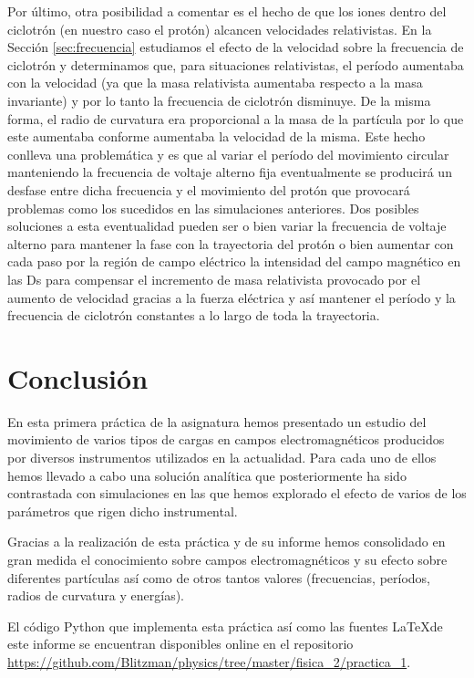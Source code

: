 \documentclass[journal]{IEEEtran}
\begin{document}
Por último, otra posibilidad a comentar es el hecho de que los iones dentro del ciclotrón (en nuestro caso el protón) alcancen velocidades relativistas. En la Sección \ref{sec:frecuencia} estudiamos el efecto de la velocidad sobre la frecuencia de ciclotrón y determinamos que, para situaciones relativistas, el período aumentaba con la velocidad (ya que la masa relativista aumentaba respecto a la masa invariante) y por lo tanto la frecuencia de ciclotrón disminuye. De la misma forma, el radio de curvatura era proporcional a la masa de la partícula por lo que este aumentaba conforme aumentaba la velocidad de la misma. Este hecho conlleva una problemática y es que al variar el período del movimiento circular manteniendo la frecuencia de voltaje alterno fija eventualmente se producirá un desfase entre dicha frecuencia y el movimiento del protón que provocará problemas como los sucedidos en las simulaciones anteriores. Dos posibles soluciones a esta eventualidad pueden ser o bien variar la frecuencia de voltaje alterno para mantener la fase con la trayectoria del protón o bien aumentar con cada paso por la región de campo eléctrico la intensidad del campo magnético en las Ds para compensar el incremento de masa relativista provocado por el aumento de velocidad gracias a la fuerza eléctrica y así mantener el período y la frecuencia de ciclotrón constantes a lo largo de toda la trayectoria.

\section{Conclusión}
\label{sec:conclusion}
En esta primera práctica de la asignatura hemos presentado un estudio del movimiento de varios tipos de cargas en campos electromagnéticos producidos por diversos instrumentos utilizados en la actualidad. Para cada uno de ellos hemos llevado a cabo una solución analítica que posteriormente ha sido contrastada con simulaciones en las que hemos explorado el efecto de varios de los parámetros que rigen dicho instrumental.

Gracias a la realización de esta práctica y de su informe hemos consolidado en gran medida el conocimiento sobre campos electromagnéticos y su efecto sobre diferentes partículas así como de otros tantos valores (frecuencias, períodos, radios de curvatura y energías).

\clearpage

El código Python que implementa esta práctica así como las fuentes \LaTeX de este informe se encuentran disponibles online en el repositorio \url{https://github.com/Blitzman/physics/tree/master/fisica_2/practica_1}.
\end{document}
